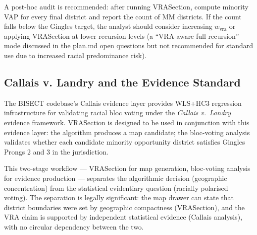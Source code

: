 A post-hoc audit is recommended: after running VRASection, compute
minority VAP for every final district and report the count of MM districts.
If the count falls below the Gingles target, the analyst should consider
increasing $w_\text{vra}$ or applying VRASection at lower recursion levels
(a ``VRA-aware full recursion'' mode discussed in the plan.md open questions
but not recommended for standard use due to increased racial predominance risk).

\subsection{Callais v. Landry and the Evidence Standard}

The BISECT codebase's Callais evidence layer provides
WLS+HC3 regression infrastructure for validating racial bloc voting
under the \emph{Callais v.\ Landry} evidence framework.
VRASection is designed to be used in conjunction with this evidence layer:
the algorithm produces a map candidate; the bloc-voting analysis validates
whether each candidate minority opportunity district satisfies Gingles
Prongs 2 and 3 in the jurisdiction.

This two-stage workflow --- VRASection for map generation, bloc-voting
analysis for evidence production --- separates the algorithmic decision
(geographic concentration) from the statistical evidentiary question
(racially polarised voting).
The separation is legally significant: the map drawer can state that
district boundaries were set by geographic compactness (VRASection),
and the VRA claim is supported by independent statistical evidence
(Callais analysis), with no circular dependency between the two.
